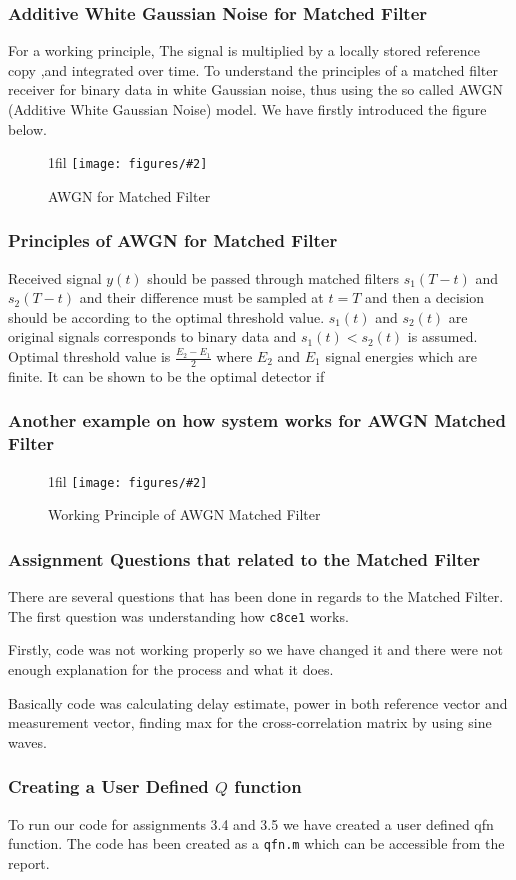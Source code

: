 \documentclass{beamer}
\makeatletter
\newcommand{\code}[1]{\texttt{#1}}
\newcommand*{\centerfloat}{%
  \parindent \z@
  \leftskip \z@ \@plus 1fil \@minus \textwidth
  \rightskip\leftskip
  \parfillskip \z@skip}
\newcommand{\fig}[3]{
  \begin{figure}[H]
  \centerfloat
    \texttt{[image: figures/\#2]}
    \caption{#3}
  \end{figure}
}
\makeatother
\begin{document}
\begin{frame}
	\frametitle{Additive White Gaussian Noise for Matched Filter}
For a working principle, The signal is multiplied by a locally stored reference copy ,and integrated over time.
To understand the principles of a matched filter receiver for binary data in white Gaussian noise, thus using the so called AWGN (Additive White Gaussian Noise) model. We have firstly introduced the figure below.
\fig{5cm}{figure_31.png}{AWGN for Matched Filter}
\end{frame}

\begin{frame}
	\frametitle{Principles of AWGN for Matched Filter}
Received signal $y(t)$ should be passed through matched filters $s_1(T-t)$ and $s_2(T-t)$ and their difference must be sampled at $t=T$ and then a decision should be according to the optimal threshold value. $s_1(t)$ and $s_2(t)$ are original signals corresponds to binary data and $s_1(t)<s_2(t)$ is assumed. Optimal threshold value is $\frac{E_2-E_1}{2}$ where $E_2$ and $E_1$ signal energies which are finite. It can be shown to be the optimal detector if
\end{frame}

\begin{frame}
	\frametitle{Another example on how system works for AWGN Matched Filter}
	\fig{5cm}{working_principle_mf.png} {Working Principle of AWGN Matched Filter}
\end{frame}
\begin{frame}
	\frametitle{Assignment Questions that related to the Matched Filter}
There are several questions that has been done in regards to the Matched Filter. The first question was understanding how \code{c8ce1} works.

Firstly, code was not working properly so we have changed it and there were not enough explanation for the process and what it does.

Basically code was calculating delay estimate, power in both reference vector and measurement vector, finding max for the cross-correlation matrix by using sine waves. 
\end{frame}

\begin{frame}
	\frametitle{Creating a User Defined $Q$ function}
To run our code for assignments 3.4 and 3.5 we have created a user defined  qfn function. The code has been created as a \code{qfn.m} which can be accessible from the report.
\end{frame}
\end{document}
